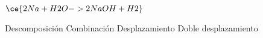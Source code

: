 $\ce{2Na + H2O -> 2NaOH + H2}$

\begin{choices}
    \CorrectChoice Descomposición
    \choice Combinación
    \choice Desplazamiento
    \choice Doble desplazamiento
\end{choices}